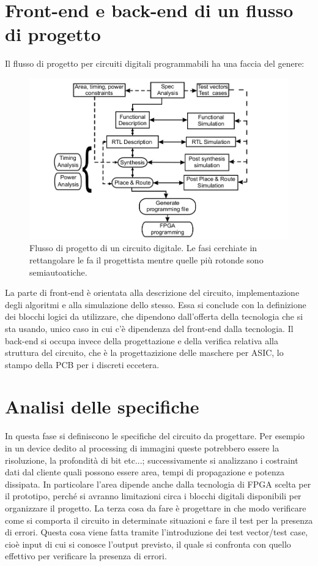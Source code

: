 \documentclass{book}
\begin{document}
\section{Front-end e back-end di un flusso di progetto}
    Il flusso di progetto per circuiti digitali programmabili ha una faccia del genere:
    \begin{figure}[h!]
        \centering
        \includegraphics[width=0.75\linewidth]{img/chapt3img1.png}
        \caption{Flusso di progetto di un circuito digitale. Le fasi cerchiate in rettangolare le fa il progettista mentre quelle più rotonde sono semiautoatiche.}
    \end{figure}
    La parte di front-end è orientata alla descrizione del circuito, implementazione degli algoritmi e alla simulazione dello stesso. Essa si conclude con la definizione dei blocchi logici da utilizzare, che dipendono dall'offerta della tecnologia che si sta usando, unico caso in cui c'è dipendenza del front-end dalla tecnologia. Il back-end si occupa invece della progettazione e della verifica relativa alla struttura del circuito, che è la progettazizione delle maschere per ASIC, lo stampo della PCB per i discreti eccetera.
\section{Analisi delle specifiche}
    In questa fase si definiscono le specifiche del circuito da progettare. Per esempio in un device dedito al processing di immagini queste potrebbero essere la risoluzione, la profondità di bit etc...; successivamente si analizzano i costraint dati dal cliente quali possono essere area, tempi di propagazione e potenza dissipata. In particolare l'area dipende anche dalla tecnologia di FPGA scelta per il prototipo, perché si avranno limitazioni circa i blocchi digitali disponibili per organizzare il progetto. La terza cosa da fare è progettare in che modo verificare come si comporta il circuito in determinate situazioni e fare il test per la presenza di errori. Questa cosa viene fatta tramite l'introduzione dei test vector/test case, cioè input di cui si conosce l'output previsto, il quale si confronta con quello effettivo per verificare la presenza di errori.
\end{document}
